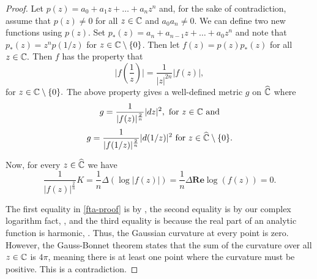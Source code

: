 \begin{proof}
 Let $p(z)=a_0+a_1z+\ldots + a_nz^n$ and, for the sake of contradiction,
 assume that $p(z)\neq 0$ for all $z\in \mathbb{C}$ and $a_0a_n\neq 0.$
 We can define two new functions using $p(z)$.
 Set $p_*(z)=a_n+a_{n-1}z+\ldots + a_0z^n$ and note that $p_*(z)=z^np(1/z)$ for $z\in \mathbb{C}\setminus\{0\}$.
 Then let $f(z)=p(z)p_*(z)$ for all $z\in \mathbb{C}.$
 Then $f$ has the property that
 $$\bigg | f\left(\frac{1}{z}\right) \bigg |=\frac{1}{|z|^{2n}}|f(z)|,$$ for $z\in \mathbb{C}\setminus\{0\}.$
 The above property gives a well-defined metric $g$ on $\widehat{\mathbb{C}}$
 where 
 $$g=\frac{1}{|f(z)|^{\frac{2}{n}}}|dz|^2, \textrm{ for } z\in \mathbb{C} \textrm{ and}$$
 $$g=\frac{1}{|f(1/z)|^{\frac{2}{n}}}|d(1/z)|^2 \textrm{ for } z\in \widehat{\mathbb{C}}\setminus\{0\}.$$
 
 Now, for every $z\in \widehat{\mathbb{C}}$ we have 
\begin{equation}\label{eq:fta-proof}
\frac{1}{|f(z)|^{\frac{2}{n}}} K =\frac{1}{n}\Delta(\log |f(z)|)=\frac{1}{n}\Delta \textbf{Re} \log(f(z))=0.
\end{equation}

 The first equality in \eqref{fta-proof} is by , the second equality is by our complex
 logarithm fact, , and the third equality is because the real part of an analytic function
 is harmonic, .
Thus, the Gaussian curvature at every point is zero. However, the Gauss-Bonnet
 theorem states that the sum of the curvature over all $z\in \mathbb{C}$ is $4\pi$, meaning there is at least
 one point where the curvature must be positive. This is a contradiction.
\end{proof}


